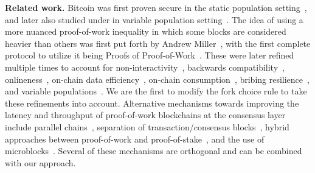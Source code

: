 \noindent
\textbf{Related work.}
Bitcoin was first proven secure in the static population setting~\cite{backbone},
and later also studied under in variable population setting~\cite{varbackbone}.
The idea of using a more nuanced proof-of-work inequality in which some blocks
are considered heavier than others was first put forth by Andrew Miller~\cite{highway},
with the first complete protocol to utilize it being
Proofs of Proof-of-Work~\cite{popow}. These were later refined multiple times
to account for non-interactivity~\cite{nipopows}, backwards compatibility~\cite{velvet-nipopows},
onlineness~\cite{logspace}, on-chain data efficiency~\cite{compact-superblocks},
on-chain consumption~\cite{gasefficient-nipopows},
bribing resilience~\cite{soft-power},
and variable populations~\cite{dionyziz}.
We are the first to modify the fork choice rule to take these refinements into
account. Alternative mechanisms towards improving the latency and throughput
of proof-of-work blockchains at the consensus
layer include parallel chains~\cite{parallel-chains},
separation of transaction/consensus blocks~\cite{prism},
hybrid approaches between proof-of-work and proof-of-stake~\cite{byzcoin},
and the use of microblocks~\cite{bitcoin-ng}. Several of these mechanisms
are orthogonal and can be combined with our approach.
